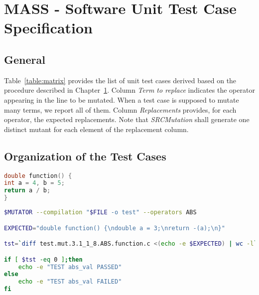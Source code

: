 
\chapter{MASS - Software Unit Test Case Specification}
\label{chap:spec}

\section{General}




Table~\ref{table:matrix} provides the list of unit test cases derived based on the procedure described in Chapter~\ref{chap:spec}. 
Column \emph{Term to replace} indicates the operator appearing in the line to be mutated. When a test case is supposed to mutate many terms, we report all of them.
Column \emph{Replacements} provides, for each operator, the expected replacements.
Note that \emph{SRCMutation} shall generate one distinct mutant for each element of the replacement column.









\clearpage

\section{Organization of the Test Cases}

\begin{lstlisting}[language=C, label=test_source, caption=C function example.]
double function() {
int a = 4, b = 5;
return a / b;
}
\end{lstlisting}

\begin{lstlisting}[language=bash, label=test_example, caption=ABS test case example.]
$MUTATOR --compilation "$FILE -o test" --operators ABS

EXPECTED="double function() {\ndouble a = 3;\nreturn -(a);\n}"

tst=`diff test.mut.3.1_1_8.ABS.function.c <(echo -e $EXPECTED) | wc -l`

if [ $tst -eq 0 ];then
    echo -e "TEST abs_val PASSED"
else
    echo -e "TEST abs_val FAILED"
fi
\end{lstlisting}


